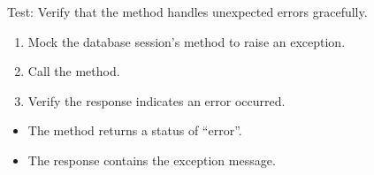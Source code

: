 \documentclass[letterpaper,10pt,english]{sphinxmanual}
\begin{document}
\begin{fulllineitems}
\label{\detokenize{test:test.test_admin.test_delete_admin_unexpected_error}}
\pysigstartsignatures
\pysiglinewithargsret
{}
{\sphinxparamcomma {}}
{}
\pysigstopsignatures
\sphinxAtStartPar
Test: Verify that the method handles unexpected errors gracefully.
\begin{description}
\begin{enumerate}
%
\item {} 
\sphinxAtStartPar
Mock the database session’s  method to raise an exception.

\item {} 
\sphinxAtStartPar
Call the  method.

\item {} 
\sphinxAtStartPar
Verify the response indicates an error occurred.

\end{enumerate}

\begin{itemize}
\item {} 
\sphinxAtStartPar
The method returns a status of “error”.

\item {} 
\sphinxAtStartPar
The response contains the exception message.

\end{itemize}

\end{description}

\end{fulllineitems}

\end{document}
